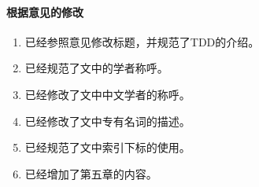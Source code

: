\documentclass[10.5pt]{article} %
\begin{document}
\paragraph{根据意见的修改}
\begin{enumerate}
    \item 已经参照意见修改标题，并规范了TDD的介绍。
    \item 已经规范了文中的学者称呼。
    \item 已经修改了文中中文学者的称呼。
    \item 已经修改了文中专有名词的描述。
    \item 已经规范了文中索引下标的使用。
    \item 已经增加了第五章的内容。
\end{enumerate}
\end{document}
